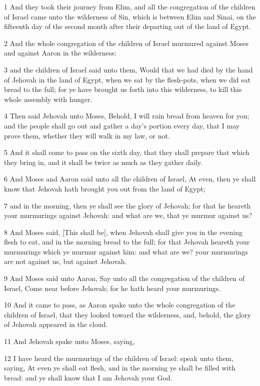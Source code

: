 \par 1 And they took their journey from Elim, and all the congregation of the children of Israel came unto the wilderness of Sin, which is between Elim and Sinai, on the fifteenth day of the second month after their departing out of the land of Egypt.
\par 2 And the whole congregation of the children of Israel murmured against Moses and against Aaron in the wilderness:
\par 3 and the children of Israel said unto them, Would that we had died by the hand of Jehovah in the land of Egypt, when we sat by the flesh-pots, when we did eat bread to the full; for ye have brought us forth into this wilderness, to kill this whole assembly with hunger.
\par 4 Then said Jehovah unto Moses, Behold, I will rain bread from heaven for you; and the people shall go out and gather a day's portion every day, that I may prove them, whether they will walk in my law, or not.
\par 5 And it shall come to pass on the sixth day, that they shall prepare that which they bring in, and it shall be twice as much as they gather daily.
\par 6 And Moses and Aaron said unto all the children of Israel, At even, then ye shall know that Jehovah hath brought you out from the land of Egypt;
\par 7 and in the morning, then ye shall see the glory of Jehovah; for that he heareth your murmurings against Jehovah: and what are we, that ye murmur against us?
\par 8 And Moses said, [This shall be], when Jehovah shall give you in the evening flesh to eat, and in the morning bread to the full; for that Jehovah heareth your murmurings which ye murmur against him: and what are we? your murmurings are not against us, but against Jehovah.
\par 9 And Moses said unto Aaron, Say unto all the congregation of the children of Israel, Come near before Jehovah; for he hath heard your murmurings.
\par 10 And it came to pass, as Aaron spake unto the whole congregation of the children of Israel, that they looked toward the wilderness, and, behold, the glory of Jehovah appeared in the cloud.
\par 11 And Jehovah spake unto Moses, saying,
\par 12 I have heard the murmurings of the children of Israel: speak unto them, saying, At even ye shall eat flesh, and in the morning ye shall be filled with bread: and ye shall know that I am Jehovah your God.
